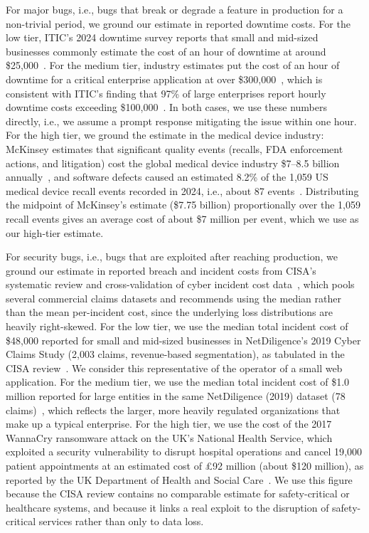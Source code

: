 \documentclass[smallextended]{svjour3}       %
\begin{document}
For major bugs, i.e., bugs that break or degrade a feature in production for a non-trivial period, we ground our estimate in reported downtime costs. For the low tier, ITIC's 2024 downtime survey reports that small and mid-sized businesses commonly estimate the cost of an hour of downtime at around \$25{,}000~\citep{itic2026downtime}. For the medium tier, industry estimates put the cost of an hour of downtime for a critical enterprise application at over \$300{,}000~\citep{cloudqa2026bugcost}, which is consistent with ITIC's finding that 97\% of large enterprises report hourly downtime costs exceeding \$100{,}000~\citep{itic2026downtime}. In both cases, we use these numbers directly, i.e., we assume a prompt response mitigating the issue within one hour. For the high tier, we ground the estimate in the medical device industry: McKinsey estimates that significant quality events (recalls, FDA enforcement actions, and litigation) cost the global medical device industry \$7--8.5 billion annually~\citep{mckinsey2026medtech}, and software defects caused an estimated 8.2\% of the 1{,}059 US medical device recall events recorded in 2024, i.e., about 87 events~\citep{meddeviceguide2026recalls}. Distributing the midpoint of McKinsey's estimate (\$7.75 billion) proportionally over the 1{,}059 recall events gives an average cost of about \$7 million per event, which we use as our high-tier estimate.

For security bugs, i.e., bugs that are exploited after reaching production, we ground our estimate in reported breach and incident costs from CISA's systematic review and cross-validation of cyber incident cost data~\citep{cisa2020cybercost}, which pools several commercial claims datasets and recommends using the median rather than the mean per-incident cost, since the underlying loss distributions are heavily right-skewed. For the low tier, we use the median total incident cost of \$48{,}000 reported for small and mid-sized businesses in NetDiligence's 2019 Cyber Claims Study (2{,}003 claims, revenue-based segmentation), as tabulated in the CISA review~\citep{cisa2020cybercost}. We consider this representative of the operator of a small web application. For the medium tier, we use the median total incident cost of \$1.0 million reported for large entities in the same NetDiligence (2019) dataset (78 claims)~\citep{cisa2020cybercost}, which reflects the larger, more heavily regulated organizations that make up a typical enterprise. For the high tier, we use the cost of the 2017 WannaCry ransomware attack on the UK's National Health Service, which exploited a security vulnerability to disrupt hospital operations and cancel 19{,}000 patient appointments at an estimated cost of \pounds92 million (about \$120 million), as reported by the UK Department of Health and Social Care~\citep{nhe2018wannacry}. We use this figure because the CISA review contains no comparable estimate for safety-critical or healthcare systems, and because it links a real exploit to the disruption of safety-critical services rather than only to data loss.
\end{document}
